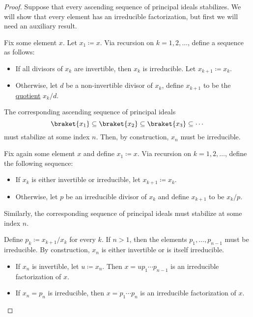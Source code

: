 \begin{proof}
   Suppose that every ascending sequence of principal ideals stabilizes. We will show that every element has an irreducible factorization, but first we will need an auxiliary result.

   Fix some element \( x \). Let \( x_1 \coloneqq x \). Via recursion on \( k = 1, 2, \ldots \), define a sequence as follows:
  \begin{itemize}
    \item If all divisors of \( x_k \) are invertible, then \( x_k \) is irreducible. Let \( x_{k+1} \coloneqq x_k \).
    \item Otherwise, let \( d \) be a non-invertible divisor of \( x_k \), define \( x_{k+1} \) to be the \hyperref[def:domain_quotient]{quotient} \( x_k / d \).
  \end{itemize}

  The corresponding ascending sequence of principal ideals
  \begin{equation*}
    \braket{ x_1 } \subseteq \braket{ x_2 } \subseteq \braket{ x_3 } \subseteq \cdots
  \end{equation*}
  must stabilize at some index \( n \). Then, by construction, \( x_n \) must be irreducible.

   Fix again some element \( x \) and define \( x_1 \coloneqq x \). Via recursion on \( k = 1, 2, \ldots \), define the following sequence:
  \begin{itemize}
    \item If \( x_k \) is either invertible or irreducible, let \( x_{k+1} \coloneqq x_k \).
    \item Otherwise, let \( p \) be an irreducible divisor of \( x_k \) and define \( x_{k+1} \) to be \( x_k / p \).
  \end{itemize}

  Similarly, the corresponding sequence of principal ideals must stabilize at some index \( n \).

  Define \( p_k \coloneqq x_{k+1} / x_k \) for every \( k \). If \( n > 1 \), then the elements \( p_1, \ldots, p_{n-1} \) must be irreducible. By construction, \( x_n \) is either invertible or is itself irreducible.
  \begin{itemize}
    \item If \( x_n \) is invertible, let \( u \coloneqq x_n \). Then \( x = u p_1 \cdots p_{n-1} \) is an irreducible factorization of \( x \).
    \item If \( x_n = p_n \) is irreducible, then \( x = p_1 \cdots p_n \) is an irreducible factorization of \( x \).
  \end{itemize}


\end{proof}
